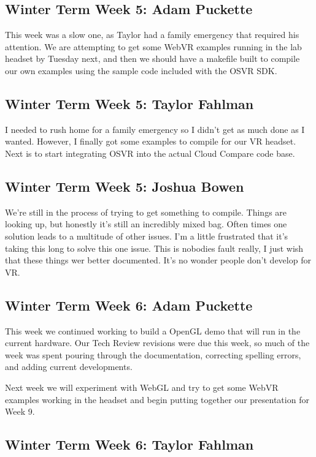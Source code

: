 \documentclass[draftclsnofoot,onecolumn]{IEEEtran}
\begin{document}
\subsection{Winter Term Week 5: Adam Puckette}

This week was a slow one, as Taylor had a family emergency that required his attention. We are attempting to get some WebVR examples running in the lab headset by Tuesday next, and then we should have a makefile built to compile our own examples using the sample code included with the OSVR SDK.

\subsection{Winter Term Week 5: Taylor Fahlman}

I needed to rush home for a family emergency so I didn't get as much done as I wanted. However, I finally got some examples to compile for our VR headset. Next is to start integrating OSVR into the actual Cloud Compare code base.

\subsection{Winter Term Week 5: Joshua Bowen}

We're still in the process of trying to get something to compile. Things are looking up, but honestly it's still an incredibly mixed bag. Often times one solution leads to a multitude of other issues. I'm a little frustrated that it's taking this long to solve this one issue. This is nobodies fault really, I just wish that these things wer better documented. It's no wonder people don't develop for VR.

\subsection{Winter Term Week 6: Adam Puckette}

This week we continued working to build a OpenGL demo that will run in the current hardware. Our Tech Review revisions were due this week, so much of the week was spent pouring through the documentation, correcting spelling errors, and adding current developments.

Next week we will experiment with WebGL and try to get some WebVR examples working in the headset and begin putting together our presentation for Week 9.

\subsection{Winter Term Week 6: Taylor Fahlman}
\end{document}
